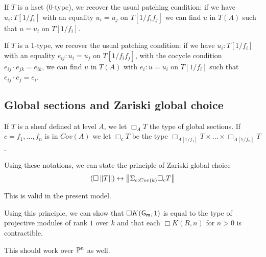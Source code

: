 \medskip

If $T$ is a hset ($0$-type), we recover the usual patching condition: if we have $u_i:T[1/f_i]$ with an equality $u_i = u_j$ on
$T[1/f_if_j]$ we can find $u$ in $T(A)$ such that $u = u_i$ on $T[1/f_i]$.

If $T$ is a $1$-type, we recover the usual patching condition: if we have $u_i:T[1/f_i]$ with an equality $e_{ij}:u_i = u_j$ on
$T[1/f_if_j]$, with the cocycle condition $e_{ij}\cdot e_{jk} = e_{ik}$,
we can find $u$ in $T(A)$ with $e_i:u = u_i$ on $T[1/f_i]$ such that $e_{ij}\cdot e_j = e_i$.





\subsection{Global sections and Zariski global choice}

If $T$ is a sheaf defined at level $A$, we let $\Box_A T$ the type of global sections.
If $c = f_1,\dots,f_n$ is in $Cov(A)$ we let $\Box_c T$ be the type $\Box_{A[1/f_1]}T\times\dots\times\Box_{A[1/f_n]}T$.

Using these notations, we can state the principle of Zariski global choice
$$
(\Box \left\lVert T \right\rVert)\leftrightarrow \left\lVert \Sigma_{c:Cov(k)}\Box_c T \right\rVert
$$

This is valid in the present model.

Using this principle, we can show that $\Box K(\mathsf{G_m},1)$ is equal to the type of projective modules of rank $1$ over $k$
and that each $\Box K(R,n)$ for $n>0$ is contractible.
                                                                                  
This should work over $\mathbb{P}^n$ as well.



 
